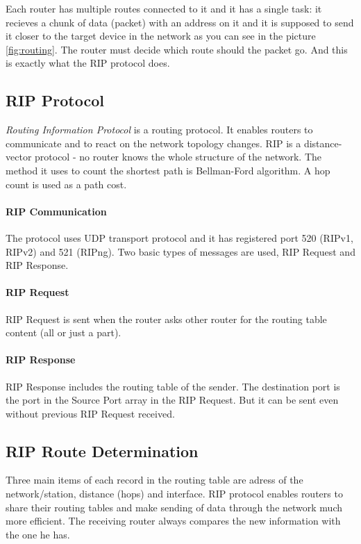 \documentclass[10pt,a4paper,titlepage]{article}
\begin{document}
    Each router has multiple routes connected to it and it has a single task: it recieves
    a chunk of data (packet) with an address on it and it is supposed to send it closer to
    the target device in the network as you can see in the picture \ref{fig:routing}.
    The router must decide which route should the packet go. And this is exactly what the RIP protocol does. 
    

    \subsection*{RIP Protocol}

    {\it Routing Information Protocol} is a routing protocol. It enables routers to communicate and to react
    on the network topology changes. RIP is a distance-vector protocol - no router knows the whole structure
    of the network. The method it uses to count the shortest path is Bellman-Ford algorithm. A hop count
    is used as a path cost.

    \paragraph{RIP Communication}
    The protocol uses UDP transport protocol and it has registered port 520 (RIPv1, RIPv2) and 521 (RIPng).
    Two basic types of messages are used, RIP Request and RIP Response.

    \paragraph{RIP Request}
    RIP Request is sent when the router asks other router for the routing table content (all or just a part).

    \paragraph{RIP Response}
    RIP Response includes the routing table of the sender. The destination port is the port in the Source Port
    array in the RIP Request. But it can be sent even without previous RIP Request received.\cite{RIPngStd}

    \subsection*{RIP Route Determination}
    Three main items of each record in the routing table are adress of the network/station, distance (hops)
    and interface. RIP protocol enables routers to share their routing tables and make sending of data through
    the network much more efficient. The receiving router always compares the new information with the one he has.
\end{document}
